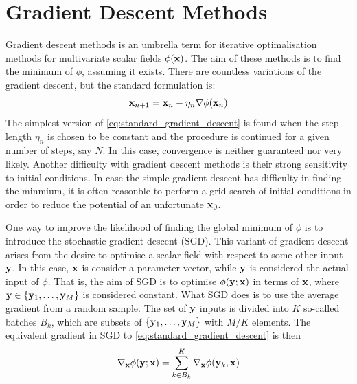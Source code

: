 \documentclass[nofootinbib,reprint,english]{revtex4-1}
\begin{document}
\section{Gradient Descent Methods}
Gradient descent methods is an umbrella term for iterative optimalisation methods for multivariate scalar fields \(\phi(\vb{x})\). The aim of these methods is to find the minimum of \(\phi\), assuming it exists. There are countless variations of the gradient descent, but the standard formulation is:
\begin{equation}\label{eq:standard_gradient_descent}
\vb{x}_{n+1}=\vb{x}_n-\eta_n\nabla\phi(\vb{x}_n)
\end{equation}
The simplest version of \eqref{eq:standard_gradient_descent} is found when the step length \(\eta_n\) is chosen to be constant and the procedure is continued for a given number of steps, say \(N\). In this case, convergence is neither guaranteed nor very likely. Another difficulty with gradient descent methods is their strong sensitivity to initial conditions. In case the simple gradient descent has difficulty in finding the minmium, it is often reasonble to perform a grid search of initial conditions in order to reduce the potential of an unfortunate \(\vb{x}_0\).

One way to improve the likelihood of finding the global minimum of \(\phi\) is to introduce the stochastic gradient descent (SGD). This variant of gradient descent arises from the desire to optimise a scalar field with respect to some other input \(\vb{y}\). In this case, \(\vb{x}\) is consider a parameter-vector, while \(\vb{y}\) is considered the actual input of \(\phi\). That is, the aim of SGD is to optimise \(\phi(\vb{y};\vb{x})\) in terms of \(\vb{x}\), where \(\vb{y}\in\{\vb{y}_1,\ldots,\vb{y}_M\}\) is considered constant. What SGD does is to use the average gradient from a random sample. The set of \(\vb{y}\) inputs is divided into \(K\) so-called batches \(B_k\), which are subsets of \(\{\vb{y}_1,\ldots,\vb{y}_M\}\) with \(M/K\) elements. The equivalent gradient in SGD to \eqref{eq:standard_gradient_descent} is then
\begin{equation}\label{eq:batch_average_gradient}
\nabla_ {\vb{x}}\phi(\vb{y};\vb{x})=\sum_{k\in B_k}^K\nabla_{\vb{x}}\phi(\vb{y}_k,\vb{x})
\end{equation}
\end{document}
